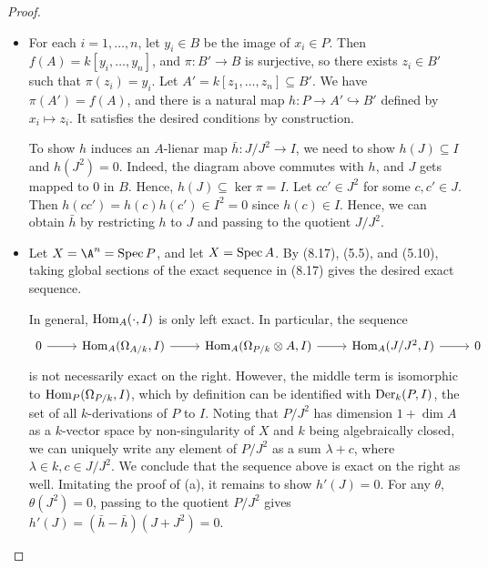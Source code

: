 \documentclass[a4paper]{article}
\begin{document}
\begin{enumerate} [label=\textbf{\arabic*.}, leftmargin=0em]
\begin{proof}
\begin{itemize} [leftmargin=0cm]
                  \item[(b)] For each $i = 1, \dots, n$, let $y_i \in B$ be the image of $x_i \in P$.
                        Then $f(A) = k[y_i, \dots, y_n]$, and $\pi : B' \to B$ is surjective, so there exists $z_i \in B'$ such that $\pi(z_i) = y_i$.
                        Let $A' = k[z_1, \dots, z_n] \subseteq B'$.
                        We have $\pi(A') = f(A)$, and there is a natural map $h : P \to A' \hookrightarrow B'$ defined by $x_i \mapsto z_i$.
                        It satisfies the desired conditions by construction.

                        To show $h$ induces an $A$-lienar map $\bar{h} : J/J^2 \to I$, we need to show $h(J) \subseteq I$ and $h(J^2) = 0$.
                        Indeed, the diagram above commutes with $h$, and $J$ gets mapped to $0$ in $B$. Hence, $h(J) \subseteq \ker{\pi} = I$.
                        Let $cc' \in J^2$ for some $c, c' \in J$. Then $h(cc') = h(c)h(c') \in I^2 = 0$ since $h(c) \in I$. Hence, we can obtain $\bar{h}$ by restricting $h$ to $J$ and passing to the quotient $J/J^2$.

                  \item[(c)] Let $X = \A^n = \spec{P}$, and let $X = \operatorname{Spec}{A}$. By (8.17), (5.5), and (5.10), taking global sections of the exact sequence in (8.17) gives the desired exact sequence.

                        In general, $\operatorname{Hom}_A(\cdot, I)$ is only left exact. In particular, the sequence
                        \[ \begin{tikzcd}
                                0 \arrow[r] & {\Hom_A(\Omega_{A/k},I)} \arrow[r] & {\Hom_A(\Omega_{P/k} \otimes A,I)} \arrow[r] & {\Hom_A(J/J^2,I)} \arrow[r] & 0
                            \end{tikzcd} \]
                        is not necessarily exact on the right.
                        However, the middle term is isomorphic to $\operatorname{Hom}_P(\Omega_{P/k}, I)$, which by definition can be identified with $\operatorname{Der}_k(P, I)$, the set of all $k$-derivations of $P$ to $I$.
                        Noting that $P/J^2$ has dimension $1 + \dim{A}$ as a $k$-vector space by non-singularity of $X$ and $k$ being algebraically closed, we can uniquely write any element of $P/J^2$ as a sum $\lambda + c$, where $\lambda \in k, c \in J/J^2$.
                        We conclude that the sequence above is exact on the right as well.
                        Imitating the proof of (a), it remains to show $h'(J) = 0$. For any $\theta$, $\theta(J^2) = 0$, passing to the quotient $P/J^2$ gives $h'(J) = (\bar{h} - \bar{h})(J + J^2) = 0$.
              \end{itemize}
          \end{proof}

\end{enumerate}
\end{document}
